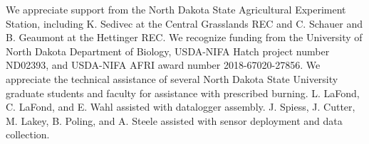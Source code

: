 \documentclass[referee, 
		     sn-basic]{sn-jnl}
\begin{document}
\begin{linenumbers}

We appreciate support from the North Dakota State Agricultural Experiment Station, including K. Sedivec at the Central Grasslands REC and C. Schauer and B. Geaumont at the Hettinger REC. 
We recognize funding from the University of North Dakota Department of Biology, USDA-NIFA Hatch project number ND02393, and USDA-NIFA AFRI award number 2018-67020-27856. 
We appreciate the technical assistance of several North Dakota State University graduate students and faculty for assistance with prescribed burning. 
L. LaFond, C. LaFond, and E. Wahl assisted with datalogger assembly. J. Spiess, J. Cutter, M. Lakey, B. Poling, and A. Steele assisted with sensor deployment and data collection.

 

\end{linenumbers}
\end{document}
